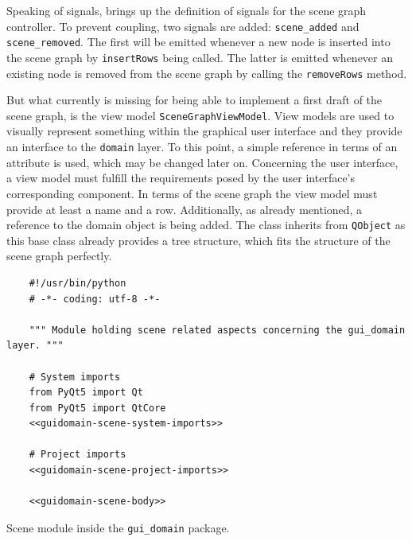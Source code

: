 \documentclass[10pt, openright, notitlepage]{scrreprt}
\begin{document}
Speaking of signals, brings up the definition of signals for the scene graph
controller. To prevent coupling, two signals are added: \texttt{scene\_added}
and \texttt{scene\_removed}. The first will be emitted whenever a new node is
inserted into the scene graph by \texttt{insertRows} being called. The latter
is emitted whenever an existing node is removed from the scene graph by calling
the \texttt{removeRows} method.

But what currently is missing for being able to implement a first draft of the
scene graph, is the view model \texttt{SceneGraphViewModel}. View models are
used to visually represent something within the graphical user interface and
they provide an interface to the \texttt{domain} layer. To this point, a
simple reference in terms of an attribute is used, which may be changed later
on. Concerning the user interface, a view model must fulfill the requirements
posed by the user interface's corresponding component. In terms of the scene
graph the view model must provide at least a name and a row. Additionally, as
already mentioned, a reference to the domain object is being added. The class
inherits from \texttt{QObject} as this base class already provides a tree
structure, which fits the structure of the scene graph perfectly.

\begin{listing}[H]
\begin{verbatim}
    #!/usr/bin/python
    # -*- coding: utf-8 -*-
    
    """ Module holding scene related aspects concerning the gui_domain layer. """
    
    # System imports
    from PyQt5 import Qt
    from PyQt5 import QtCore
    <<guidomain-scene-system-imports>>
    
    # Project imports
    <<guidomain-scene-project-imports>>
    
    <<guidomain-scene-body>>
\end{verbatim}
\caption{\label{guidomain-scene}
Scene module inside the \texttt{gui\_domain} package.}
\end{listing}
\end{document}
